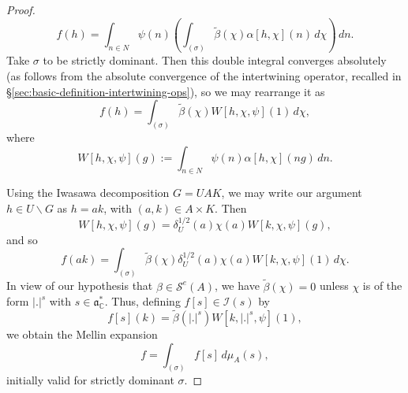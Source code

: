 \documentclass[reqno]{amsart}
\theoremstyle{plain} \newtheorem{theorem} {Theorem}
\theoremstyle{definition} \newtheorem{definition} [theorem] {Definition}
\theoremstyle{itplain} %
\numberwithin{equation}{section}
\numberwithin{theorem}{section}
\begin{document}
\begin{proof}
  \begin{equation*}
    f(h) = \int _{n \in N } \psi(n)
    \left(
      \int _{(\sigma)} \tilde{\beta}(\chi) \alpha[h,\chi](n) \, d \chi
    \right)
    \, d n.
  \end{equation*}
  Take $\sigma$ to be strictly dominant.  Then this double integral converges absolutely (as follows from the absolute
  convergence of the intertwining operator, recalled in \S\ref{sec:basic-definition-intertwining-ops}), so we may rearrange it as
  \begin{equation}\label{eq:fh-=-int-1}
    f(h) = \int _{(\sigma)} \tilde{\beta}(\chi) W[h,\chi,\psi](1) \, d \chi,
  \end{equation}
  where
  \begin{equation*}
    W[h,\chi,\psi](g) := \int _{n \in N}
    \psi(n) \alpha[h,\chi](n g) \, d n.
  \end{equation*}

  Using the Iwasawa decomposition $G = U A K$, we may write our argument $h \in U \backslash G$ as $h = a k$, with $(a,k) \in A \times K$.  Then
  \begin{equation*}
    W[h,\chi,\psi](g) = \delta_{U}^{1/2}(a) \chi(a) W[k,\chi,\psi](g),
  \end{equation*}
  and so
  \begin{equation}\label{eq:fa-k-=contour}
    f(a k)
    = \int _{(\sigma)} \tilde{\beta}(\chi) \delta_{U}^{1/2}(a) \chi(a) W[k,\chi,\psi](1) \, d \chi.
  \end{equation}
  In view of our hypothesis that $\beta \in \mathcal{S}^e(A)$, we have $\tilde{\beta}(\chi) = 0$ unless $\chi$ is of the form $|.|^s$ with $s \in \mathfrak{a}_{\mathbb{C}}^*$.  Thus, defining $f[s] \in \mathcal{I}(s)$ by
  \begin{equation*}
    f[s](k) = \tilde{\beta}(|.|^s)  W[k,|.|^s,\psi](1),
  \end{equation*}
  we obtain the Mellin expansion
  \begin{equation*}
    f = \int _{(\sigma)} f[s] \, d \mu_{A}(s),
  \end{equation*}
  initially valid for strictly dominant $\sigma$.


\end{proof}
\end{document}
